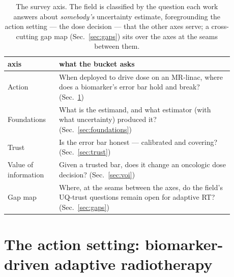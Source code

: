 \documentclass[review,number]{elsarticle}
\begin{document}
\begin{table}
\caption{The survey axis. The field is classified by the question each work answers
about \emph{somebody's} uncertainty estimate, foregrounding the action setting --- the
dose decision --- that the other axes serve; a cross-cutting gap map
(Sec.~\ref{sec:gaps}) sits over the axes at the seams between them.}
\label{tab:axis}
\centering
\begin{tabular}{p{0.20\linewidth}p{0.68\linewidth}}
\toprule
axis & what the bucket asks \\
\midrule
Action & When deployed to drive dose on an MR-linac, where does a biomarker's error bar hold and break? (Sec.~\ref{sec:action}) \\
Foundations & What is the estimand, and what estimator (with what uncertainty) produced it? (Sec.~\ref{sec:foundations}) \\
Trust & Is the error bar honest --- calibrated and covering? (Sec.~\ref{sec:trust}) \\
Value of information & Given a trusted bar, does it change an oncologic dose decision? (Sec.~\ref{sec:voi}) \\
Gap map & Where, at the seams between the axes, do the field's UQ-trust questions remain open for adaptive RT? (Sec.~\ref{sec:gaps}) \\
\bottomrule
\end{tabular}
\end{table}

\section{The action setting: biomarker-driven adaptive radiotherapy}
\label{sec:action}
\end{document}
